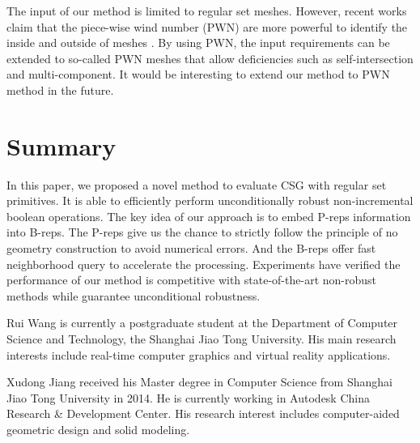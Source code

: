 \documentclass[10pt,journal,compsoc]{IEEEtran}
\begin{document}
The input of our method is limited to regular set meshes. However, recent works claim that the piece-wise wind number (PWN) are more powerful to identify the inside and outside of meshes \cite{zhou2016mesh}.  By using PWN, the input requirements can be extended to so-called PWN meshes that allow deficiencies such as self-intersection and multi-component. It would be interesting to extend our method to PWN method in the future.


\section{Summary}

In this paper, we proposed a novel method to evaluate CSG with regular set primitives. It is able to efficiently perform unconditionally robust non-incremental boolean operations. The key idea of our approach is to embed P-reps information into B-reps. The P-reps give us the chance to strictly follow the principle of no geometry construction to avoid numerical errors. And the B-reps offer fast neighborhood query to accelerate the processing. Experiments have verified the performance of our method is competitive with state-of-the-art non-robust methods while guarantee unconditional robustness.



\appendices







\begin{IEEEbiography}{Rui Wang}
is currently a postgraduate student at the Department of Computer Science and Technology, the Shanghai Jiao Tong University. His main research interests include real-time computer graphics and virtual reality applications.
\end{IEEEbiography}

\begin{IEEEbiography}{Xudong Jiang}
received his Master degree in Computer Science from Shanghai Jiao Tong University in 2014. He is currently working in Autodesk China Research \& Development Center. His research interest includes computer-aided geometric design and solid modeling.
\end{IEEEbiography}
\end{document}
